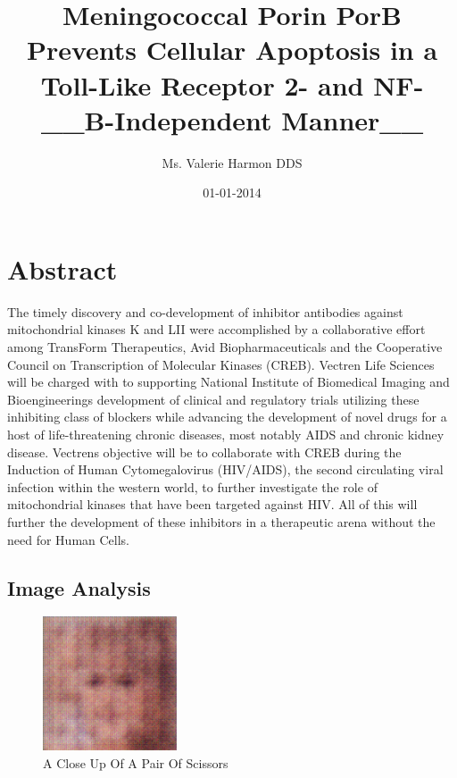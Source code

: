 \documentclass{article}%
\title{Meningococcal Porin PorB Prevents Cellular Apoptosis in a Toll{-}Like Receptor 2{-} and NF{-}\_\_B{-}Independent Manner\_\_}%
\author{Ms. Valerie Harmon DDS}%
\affil{CAS Key Laboratory of Pathogenic Microbiology and Immunology, Institute of Microbiology, Chinese Academy of Sciences, Beijing, China}%
\date{01{-}01{-}2014}%
\begin{document}
%
\normalsize%
\maketitle%
\section{Abstract}%
\label{sec:Abstract}%
The timely discovery and co{-}development of inhibitor antibodies against mitochondrial kinases K and LII were accomplished by a collaborative effort among TransForm Therapeutics, Avid Biopharmaceuticals and the Cooperative Council on Transcription of Molecular Kinases (CREB). Vectren Life Sciences will be charged with to supporting National Institute of Biomedical Imaging and Bioengineerings development of clinical and regulatory trials utilizing these inhibiting class of blockers while advancing the development of novel drugs for a host of life{-}threatening chronic diseases, most notably AIDS and chronic kidney disease. Vectrens objective will be to collaborate with CREB during the Induction of Human Cytomegalovirus (HIV/AIDS), the second circulating viral infection within the western world, to further investigate the role of mitochondrial kinases that have been targeted against HIV. All of this will further the development of these inhibitors in a therapeutic arena without the need for Human Cells.

%
\subsection{Image Analysis}%
\label{subsec:ImageAnalysis}%


\begin{figure}[h!]%
\centering%
\includegraphics[width=150px]{500_fake_images/samples_5_75.png}%
\caption{A Close Up Of A Pair Of Scissors}%
\end{figure}

%
\end{document}
